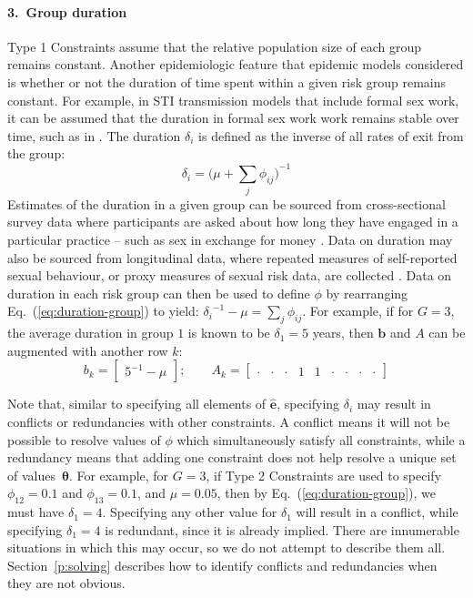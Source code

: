 \paragraph{3.~Group duration}
\label{con:group-dur}
Type 1 Constraints assume that the relative population size of each group remains constant.
Another epidemiologic feature that epidemic models considered
is whether or not the duration of time spent within a given risk group remains constant.
For example, in STI transmission models that include formal sex work,
it can be assumed that the duration in formal sex work work remains stable over time,
such as in \citep{Mishra2014,Boily2015}.
The duration $\delta_i$ is defined as the inverse of all rates of exit from the group:
\begin{equation}\label{eq:duration-group}
\delta_i = {\bigg(\mu + \sum_{j}{\phi_{ij}}\bigg)}^{-1}
\end{equation}
Estimates of the duration in a given group can be sourced from
cross-sectional survey data where participants are asked about
how long they have engaged in a particular practice
-- such as sex in exchange for money \citep{Watts2010}.
Data on duration may also be sourced from longitudinal data,
where repeated measures of self-reported sexual behaviour,
or proxy measures of sexual risk data,
are collected \citep{DHS,PHIAproject}.
Data on duration in each risk group can then be used to define $\phi$ by
rearranging Eq.~(\ref{eq:duration-group}) to yield:
${\delta_{i}}^{-1} - \mu = \sum_{j}{\phi_{ij}}$.
For example, if for $G = 3$,
the average duration in group $1$ is known to be $\delta_1 = 5$ years,
then $\bm{b}$ and $A$ can be augmented with another row $k$:
\begin{equation}\label{eq:eg-dur}
b_k = \left[\begin{array}{c}
{5}^{-1} - \mu
\end{array}\right];\qquad
A_k = \left[\begin{array}{ccccccccc}
  \cdot & \cdot & \cdot & 1 & 1 & \cdot & \cdot & \cdot & \cdot
\end{array}\right]
\end{equation}
\par
Note that, similar to specifying all elements of $\bm{\hat{e}}$,
specifying $\delta_i$ may result in conflicts or redundancies with other constraints.
A conflict means it will not be possible to resolve values of $\phi$
which simultaneously satisfy all constraints, while
a redundancy means that adding one constraint does not help resolve
a unique set of values~$\bm{\theta}$.
For example, for $G = 3$,
if Type 2 Constraints are used to specify $\phi_{12} = 0.1$ and $\phi_{13} = 0.1$,
and $\mu = 0.05$, then by Eq.~(\ref{eq:duration-group}), we must have
$\delta_1 = 4$.
Specifying any other value for $\delta_1$ will result in a conflict,
while specifying $\delta_1 = 4$ is redundant,
since it is already implied.
There are innumerable situations in which this may occur,
so we do not attempt to describe them all.
Section~\ref{p:solving} describes how to identify
conflicts and redundancies when they are not obvious.
